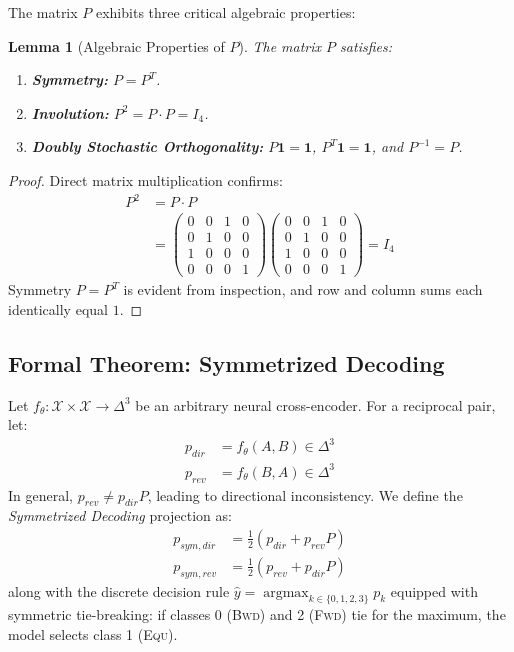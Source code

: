 \documentclass[11pt,a4paper,twocolumn]{article}
\newtheorem{lemma}{Lemma}
\begin{document}
The matrix $P$ exhibits three critical algebraic properties:
\begin{lemma}[Algebraic Properties of $P$]
\label{lem:properties}
The matrix $P$ satisfies:
\begin{enumerate}
    \item \textbf{Symmetry:} $P = P^T$.
    \item \textbf{Involution:} $P^2 = P \cdot P = I_4$.
    \item \textbf{Doubly Stochastic Orthogonality:} $P \mathbf{1} = \mathbf{1}$, $P^T \mathbf{1} = \mathbf{1}$, and $P^{-1} = P$.
\end{enumerate}
\end{lemma}
\begin{proof}
Direct matrix multiplication confirms:
\begin{align*}
P^2 &= P \cdot P \\
&= \begin{pmatrix}
0 & 0 & 1 & 0 \\
0 & 1 & 0 & 0 \\
1 & 0 & 0 & 0 \\
0 & 0 & 0 & 1
\end{pmatrix}
\begin{pmatrix}
0 & 0 & 1 & 0 \\
0 & 1 & 0 & 0 \\
1 & 0 & 0 & 0 \\
0 & 0 & 0 & 1
\end{pmatrix} = I_4
\end{align*}
Symmetry $P = P^T$ is evident from inspection, and row and column sums each identically equal $1$.
\end{proof}

\subsection{Formal Theorem: Symmetrized Decoding}
Let $f_\theta: \mathcal{X} \times \mathcal{X} \to \Delta^3$ be an arbitrary neural cross-encoder. For a reciprocal pair, let:
\begin{align}
p_{dir} &= f_\theta(A, B) \in \Delta^3 \\
p_{rev} &= f_\theta(B, A) \in \Delta^3
\end{align}
In general, $p_{rev} \ne p_{dir} P$, leading to directional inconsistency. We define the \textit{Symmetrized Decoding} projection as:
\begin{align}
p_{sym,dir} &= \frac{1}{2}\left(p_{dir} + p_{rev} P\right) \label{eq:psym_dir} \\
p_{sym,rev} &= \frac{1}{2}\left(p_{rev} + p_{dir} P\right) \label{eq:psym_rev}
\end{align}
along with the discrete decision rule $\hat{y} = \operatorname{argmax}_{k \in \{0,1,2,3\}} p_k$ equipped with symmetric tie-breaking: if classes 0 (\textsc{Bwd}) and 2 (\textsc{Fwd}) tie for the maximum, the model selects class 1 (\textsc{Equ}).
\end{document}
